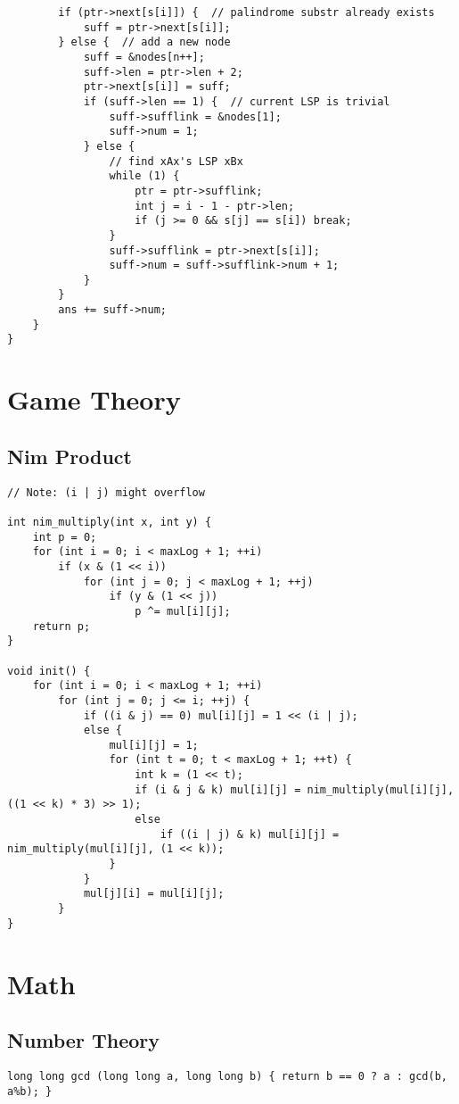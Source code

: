 \documentclass[10pt,landscape]{article}
\begin{document}
\begin{multicols}{2}
\begin{lstlisting}
        if (ptr->next[s[i]]) {  // palindrome substr already exists
            suff = ptr->next[s[i]];
        } else {  // add a new node
            suff = &nodes[n++];
            suff->len = ptr->len + 2;
            ptr->next[s[i]] = suff;
            if (suff->len == 1) {  // current LSP is trivial
                suff->sufflink = &nodes[1];
                suff->num = 1;
            } else {
                // find xAx's LSP xBx
                while (1) {
                    ptr = ptr->sufflink;
                    int j = i - 1 - ptr->len;
                    if (j >= 0 && s[j] == s[i]) break;
                }
                suff->sufflink = ptr->next[s[i]];
                suff->num = suff->sufflink->num + 1;
            }
        }
        ans += suff->num;
    }
}
\end{lstlisting}
\section{Game Theory}
\subsection{Nim Product}
\begin{lstlisting}
// Note: (i | j) might overflow

int nim_multiply(int x, int y) {
    int p = 0;
    for (int i = 0; i < maxLog + 1; ++i)
        if (x & (1 << i))
            for (int j = 0; j < maxLog + 1; ++j)
                if (y & (1 << j))
                    p ^= mul[i][j];
    return p;
}

void init() {
    for (int i = 0; i < maxLog + 1; ++i)
        for (int j = 0; j <= i; ++j) {
            if ((i & j) == 0) mul[i][j] = 1 << (i | j);
            else {
                mul[i][j] = 1;
                for (int t = 0; t < maxLog + 1; ++t) {
                    int k = (1 << t);
                    if (i & j & k) mul[i][j] = nim_multiply(mul[i][j], ((1 << k) * 3) >> 1);
                    else
                        if ((i | j) & k) mul[i][j] = nim_multiply(mul[i][j], (1 << k));
                }
            }
            mul[j][i] = mul[i][j];
        }
}
\end{lstlisting}
\section{Math}
\subsection{Number Theory}
\begin{lstlisting}
long long gcd (long long a, long long b) { return b == 0 ? a : gcd(b, a%b); }


\end{lstlisting}
\end{multicols}
\end{document}
